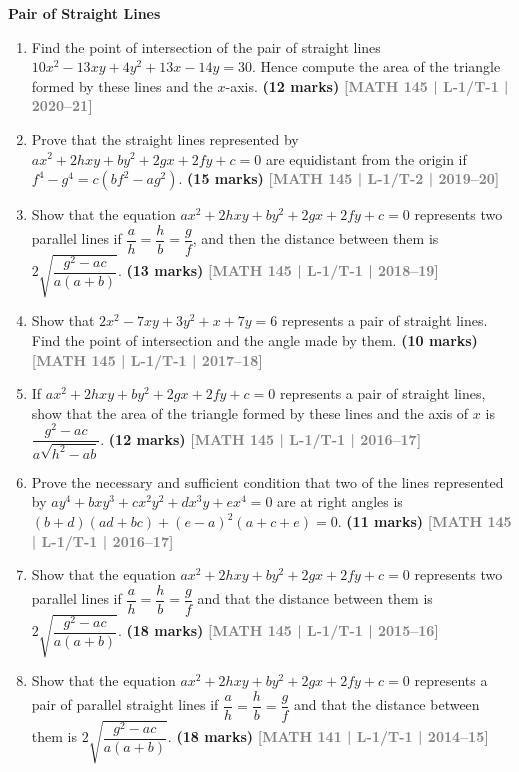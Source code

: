 \documentclass[12pt,a4paper]{article}
\newcommand{\yr}[1]{\hfill\textcolor{gray}{\small\textbf{[#1]}}}
\newcommand{\mk}[1]{\textcolor{orange!70!black}{\small\textbf{(#1 marks)}}}
\newcommand{\subtopic}[2]{%
  \vspace{10pt}
  \noindent\begin{tcolorbox}[colback=#1!8,colframe=#1,boxrule=0.6pt,arc=4pt,
    left=6pt,right=6pt,top=4pt,bottom=4pt]
    \small\bfseries\textcolor{#1}{#2}
  \end{tcolorbox}
  \vspace{2pt}
}
\begin{document}
\subtopic{cH}{Pair of Straight Lines}
\label{sub:s10-pairlines}

\begin{enumerate}\item Find the point of intersection of the pair of straight lines $10x^{2}-13xy+4y^{2}+13x-14y=30$. Hence compute the area of the triangle formed by these lines and the $x$-axis.
\mk{12} \yr{MATH 145 | L-1/T-1 | 2020--21}


\item Prove that the straight lines represented by $ax^{2}+2hxy+by^{2}+2gx+2fy+c=0$ are equidistant from the origin if $f^{4}-g^{4}=c(bf^{2}-ag^{2})$.
\mk{15} \yr{MATH 145 | L-1/T-2 | 2019--20}

\item Show that the equation $ax^{2}+2hxy+by^{2}+2gx+2fy+c=0$ represents two parallel lines if $\dfrac{a}{h}=\dfrac{h}{b}=\dfrac{g}{f}$, and then the distance between them is $2\sqrt{\dfrac{g^{2}-ac}{a(a+b)}}$.
\mk{13} \yr{MATH 145 | L-1/T-1 | 2018--19}

\item Show that $2x^{2}-7xy+3y^{2}+x+7y=6$ represents a pair of straight lines. Find the point of intersection and the angle made by them.
\mk{10} \yr{MATH 145 | L-1/T-1 | 2017--18}

\item If $ax^{2}+2hxy+by^{2}+2gx+2fy+c=0$ represents a pair of straight lines, show that the area of the triangle formed by these lines and the axis of $x$ is $\dfrac{g^{2}-ac}{a\sqrt{h^{2}-ab}}$.
\mk{12} \yr{MATH 145 | L-1/T-1 | 2016--17}

\item Prove the necessary and sufficient condition that two of the lines represented by $ay^{4}+bxy^{3}+cx^{2}y^{2}+dx^{3}y+ex^{4}=0$ are at right angles is $(b+d)(ad+bc)+(e-a)^{2}(a+c+e)=0$.
\mk{11} \yr{MATH 145 | L-1/T-1 | 2016--17}

\item Show that the equation $ax^{2}+2hxy+by^{2}+2gx+2fy+c=0$ represents two parallel lines if $\dfrac{a}{h}=\dfrac{h}{b}=\dfrac{g}{f}$ and that the distance between them is $2\sqrt{\dfrac{g^{2}-ac}{a(a+b)}}$.
\mk{18} \yr{MATH 145 | L-1/T-1 | 2015--16}

\item Show that the equation $ax^{2}+2hxy+by^{2}+2gx+2fy+c=0$ represents a pair of parallel straight lines if $\dfrac{a}{h}=\dfrac{h}{b}=\dfrac{g}{f}$ and that the distance between them is $2\sqrt{\dfrac{g^{2}-ac}{a(a+b)}}$.
\mk{18} \yr{MATH 141 | L-1/T-1 | 2014--15}


\end{enumerate}
\end{document}
